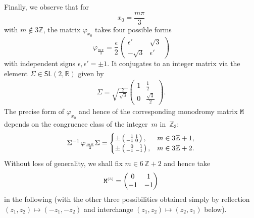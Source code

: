 \documentclass[10pt,a4paper]{amsart}
\numberwithin{equation}{section}
\newcommand{\Z}{\zed}
\newcommand{\sfSL}{\mathsf{SL}}
\newcommand{\zed}{{\mathbb Z}} %
\newcommand{\real}{{\mathbb R}} %
\begin{document}
Finally, we observe that for
\[
x_0 = \frac{m \pi}3
\]
with $m\notin 3 \Z$, the matrix $\varphi_{x_0}$ takes four possible forms
\[
\varphi^{\phantom{\dag}}_{\frac{m\,\pi}3} =
\frac\epsilon2\left(\begin{matrix} \epsilon' & \sqrt3 \\ -\sqrt3 &
 \epsilon' \end{matrix}\right)
\]
with independent signs $\epsilon,\epsilon'=\pm 1$. It
conjugates to an
integer matrix via the element $\Sigma\in\sfSL(2,\real)$ given by
\begin{gather}\label{eq:Sigmaell}
\Sigma = \sqrt{\tfrac2{\sqrt3}} \left(\begin{matrix} 1 & \frac12
 \\ 0 & \frac{\sqrt3}2 \end{matrix}\right) .
\end{gather}
The precise form of $\varphi^{\phantom{\dag}}_{x_0}$ and hence of the
corresponding monodromy matrix $\tt M$ depends on the congruence
class of the integer~$m$ in~$\Z_3$:
\[
\Sigma^{-1} \, \varphi^{\phantom{\dag}}_{\frac{m \pi}3}
\Sigma = \begin{cases}
\pm \left(\begin{smallmatrix} \hphantom{-}1 & 1 \\ -1 & 0\end{smallmatrix}\right) , & m\in 3 \Z+1 ,
\\
\pm \left(\begin{smallmatrix} \hphantom{-}0 & \hphantom{-}1 \\ -1 & -1\end{smallmatrix}\right), & m\in 3 \Z+2 .
\end{cases}
\]
Without loss of generality, we shall fix $m\in 6\,\Z+2$ and hence take
\begin{gather}\label{eq:mon3}
{\tt M}^{\text{\tiny(3)}} = \left( \begin{matrix}
0&1\\ -1&-1
\end{matrix}\right)
\end{gather}
in the following (with the other three possibilities obtained simply
by reflection $(z_1,z_2)\mapsto(-z_1,-z_2)$ and interchange
$(z_1,z_2)\mapsto(z_2,z_1)$ below).
\end{document}
